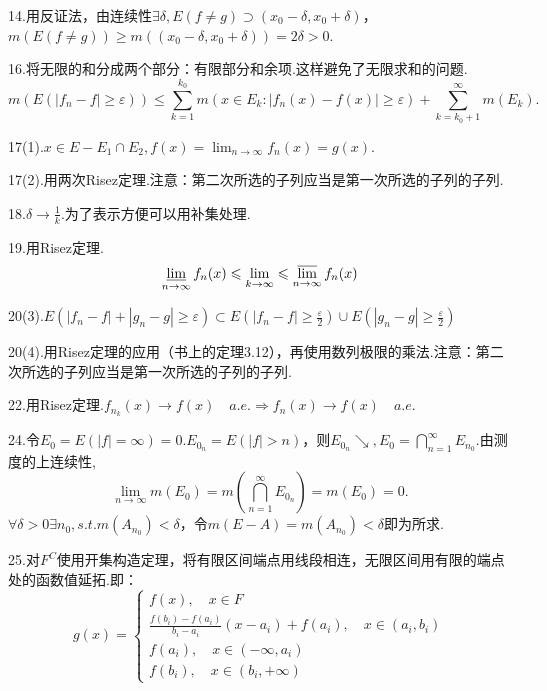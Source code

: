 \documentclass[bwprint, withoutpreface]{cumcmthesis}
\begin{document}
14.用反证法，由连续性$\exists \delta, E(f \neq g) \supset (x_0 - \delta, x_0 + \delta)$，$m(E(f \neq g)) \geqslant m((x_0 - \delta, x_0 + \delta)) = 2\delta > 0$.

16.将无限的和分成两个部分：有限部分和余项.这样避免了无限求和的问题.
\begin{equation*}
	m(E(|f_n - f| \geqslant \varepsilon)) \leqslant \sum_{k = 1}^{k_0}{m(x \in E_k:|f_n(x) - f(x)| \geqslant \varepsilon)} + \sum_{k = k_0 + 1}^{\infty}{m(E_k)}.
\end{equation*}

17(1).$x \in E - E_1 \cap E_2, f(x) = \lim_{n \to \infty}{f_n(x)} = g(x)$.

17(2).用两次Risez定理.注意：第二次所选的子列应当是第一次所选的子列的子列.

18.$\delta \to \frac{1}{k}$.为了表示方便可以用补集处理.

19.用Risez定理.
\begin{equation*}
	\varliminf_{n \to \infty}{f_n(x)} \leqslant \lim_{k \to \infty} \leqslant \varlimsup_{n \to \infty}{f_n(x)}
\end{equation*}

20(3).$E(|f_n - f| + |g_n - g| \geqslant \varepsilon) \subset E(|f_n - f| \geqslant \frac{\varepsilon}{2}) \cup E(|g_n - g| \geqslant \frac{\varepsilon}{2})$

20(4).用Risez定理的应用（书上的定理3.12），再使用数列极限的乘法.注意：第二次所选的子列应当是第一次所选的子列的子列.

22.用Risez定理.$f_{n_k}(x) \to f(x) \quad a.e. \Rightarrow f_n(x) \to f(x) \quad a.e.$

24.令$E_0 = E(|f| = \infty) = 0. E_{0_n} = E(|f| > n)$，则$E_{0_n} \searrow, E_0 = \bigcap_{n = 1}^{\infty}{E_{n_0}}$.由测度的上连续性,
\begin{equation*}
	\lim_{n \to \infty} m(E_0) = m(\bigcap_{n = 1}^{\infty}{E_{0_n}}) = m(E_0) = 0.
\end{equation*}
$\forall \delta > 0 \exists n_0, s.t. m(A_{n_0}) < \delta$，令$m(E - A) = m(A_{n_0}) < \delta$即为所求.

25.对$F^C$使用开集构造定理，将有限区间端点用线段相连，无限区间用有限的端点处的函数值延拓.即：
\begin{equation*}
	g(x) = 
	\begin{cases}
		f(x), \quad x \in F \\
		\frac{f(b_i) - f(a_i)}{b_i - a_i} (x - a_i) + f(a_i), \quad x \in (a_i, b_i) \\
		f(a_i), \quad x \in (-\infty, a_i) \\
		f(b_i), \quad x \in (b_i, +\infty)
	\end{cases}
\end{equation*}
\end{document}
